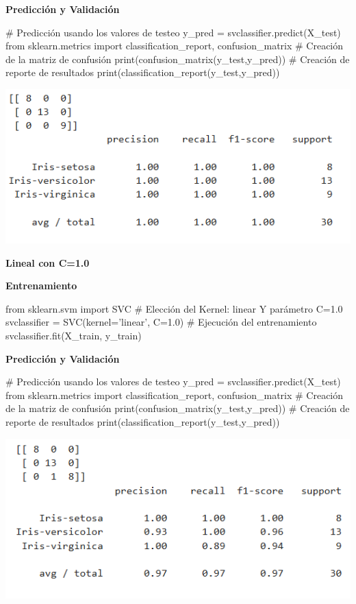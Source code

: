 \documentclass[paper=a4, fontsize=11pt]{scrartcl}
\numberwithin{equation}{section}		%
\numberwithin{figure}{section}			%
\numberwithin{table}{section}				%
\begin{document}
    \textbf{Predicción y Validación}
    
    \begin{python}
    # Predicción usando los valores de testeo
    y_pred = svclassifier.predict(X_test)
    from sklearn.metrics import classification_report, confusion_matrix
    # Creación de la matriz de confusión
    print(confusion_matrix(y_test,y_pred))
    # Creación de reporte de resultados
    print(classification_report(y_test,y_pred))
    \end{python}
    
    \includegraphics[scale=0.8]{lineal_c_05}
    \newpage
    
    \textbf{Lineal con C=1.0}
    
    \textbf{Entrenamiento}
    
    \begin{python}
    from sklearn.svm import SVC
    # Elección del Kernel: linear Y parámetro C=1.0
    svclassifier = SVC(kernel='linear', C=1.0)
    # Ejecución del entrenamiento
    svclassifier.fit(X_train, y_train)
    \end{python}
    
    \textbf{Predicción y Validación}
    
    \begin{python}
    # Predicción usando los valores de testeo
    y_pred = svclassifier.predict(X_test)
    from sklearn.metrics import classification_report, confusion_matrix
    # Creación de la matriz de confusión
    print(confusion_matrix(y_test,y_pred))
    # Creación de reporte de resultados
    print(classification_report(y_test,y_pred))
    \end{python}
    
    \includegraphics[scale=0.8]{lineal_c_10}
    \newpage
    
\end{document}
